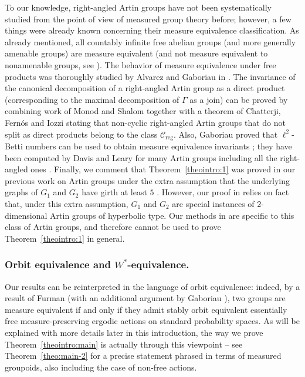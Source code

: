\documentclass[JEP,XML,SOM,Unicode,NoFloatCountersInSection,published]{cedram}
\let\mathcal\mathscr
\theoremstyle{plain}
\theoremstyle{definition}
\begin{document}
To our knowledge, right-angled Artin groups have not been systematically studied from the point of view of measured group theory before; however, a few things were already known concerning their measure equivalence classification. As already mentioned, all countably infinite free abelian groups (and more generally amenable groups) are measure equivalent \cite{Dye2,OW} (and not measure equivalent to nonamenable groups, see \eg \cite[Cor.\,3.2]{Fur-survey}). The behavior of measure equivalence under free products was thoroughly studied by Alvarez and Gaboriau in \cite{AG}. The invariance of the canonical decomposition of a right-angled Artin group as a direct product (corresponding to the maximal decomposition of $\Gamma$ as a join) can be proved by combining work of Monod and Shalom \cite[Th\,1.16 \& 1.17]{MS} together with a theorem of Chatterji, Fernós and Iozzi \cite[Cor.\,1.8]{CFI} stating that non-cyclic right-angled Artin groups that do not split as direct products belong to the class $\mathcal{C}_{\mathrm{reg}}$. Also, Gaboriau proved that $\ell^2$-Betti numbers can be used to obtain measure equivalence invariants \cite{Gab-betti}; they have been computed by Davis and Leary for many Artin groups including all the right-angled ones \cite{DL}. Finally, we comment that Theorem~\ref{theointro:1} was proved in our previous work on Artin groups under the extra assumption that the underlying graphs of $G_1$ and $G_2$ have girth at least $5$ \cite[Cor.\,10.3]{HH}. However, our proof in \cite{HH} relies on fact that, under this extra assumption, $G_1$ and $G_2$ are special instances of $2$-dimensional Artin groups of hyperbolic type. Our methods in \cite{HH} are specific to this class of Artin groups, and therefore cannot be used to prove Theorem~\ref{theointro:1} in general.

\subsubsection*{Orbit equivalence and $W^*$-equivalence.} Our results can be reinterpreted in the language of orbit equivalence: indeed, by a result of Furman \cite{Fur2} (with an additional argument by Gaboriau \cite[Th.\,2.3]{Gab2}), two groups are measure equivalent if and only if they admit stably orbit equivalent essentially free measure-preserving ergodic actions on standard probability spaces. As will be explained with more details later in this introduction, the way we prove Theorem~\ref{theointro:main} is actually through this viewpoint -- see Theorem~\ref{theo:main-2} for a precise statement phrased in terms of measured groupoids, also including the case of non-free actions.
\end{document}
